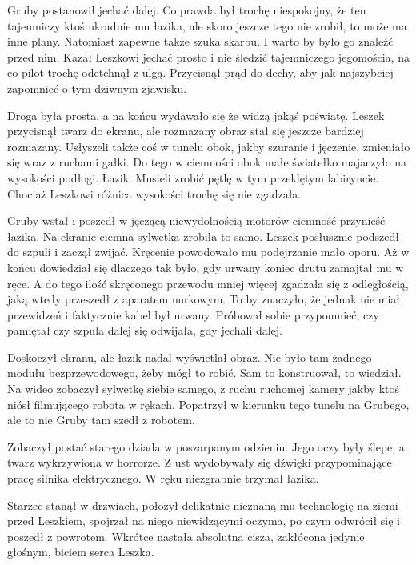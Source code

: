 
Gruby postanowił jechać dalej. Co prawda był trochę niespokojny, że ten tajemniczy ktoś ukradnie mu łazika, ale skoro jeszcze tego nie zrobił, to może ma inne plany.
Natomiast zapewne także szuka skarbu. I warto by było go znaleźć przed nim.
Kazał Leszkowi jechać prosto i nie śledzić tajemniczego jegomościa, na co pilot trochę odetchnął z ulgą.
Przycisnął prąd do dechy, aby jak najszybciej zapomnieć o tym dziwnym zjawisku.

Droga była prosta, a na końcu wydawało się że widzą jakąś poświatę.
Leszek przycisnął twarz do ekranu, ale rozmazany obraz stał się jeszcze bardziej rozmazany.
Usłyszeli także coś w tunelu obok, jakby szuranie i jęczenie, zmieniało się wraz z ruchami gałki.
Do tego w ciemności obok małe światełko majaczyło na wysokości podłogi. Łazik.
Musieli zrobić pętlę w tym przeklętym labiryncie.
Chociaż Leszkowi różnica wysokości trochę się nie zgadzała.

Gruby wstał i poszedł w jęczącą niewydolnością motorów ciemność przynieść łazika.
Na ekranie ciemna sylwetka zrobiła to samo.
Leszek posłusznie podszedł do szpuli i zaczął zwijać.
Kręcenie powodowało mu podejrzanie mało oporu.
Aż w końcu dowiedział się dlaczego tak było, gdy urwany koniec drutu zamajtał mu w ręce.
A do tego ilość skręconego przewodu mniej więcej zgadzała się z odległością, jaką wtedy przeszedł z aparatem nurkowym.
To by znaczyło, że jednak nie miał przewidzeń i faktycznie kabel był urwany.
Próbował sobie przypomnieć, czy pamiętał czy szpula dalej się odwijała, gdy jechali dalej.

Doskoczył ekranu, ale łazik nadal wyświetlał obraz.
Nie było tam żadnego modułu bezprzewodowego, żeby mógł to robić. Sam to konstruował, to wiedział.
Na wideo zobaczył sylwetkę siebie samego, z ruchu ruchomej kamery jakby ktoś niósł filmującego robota w rękach.
Popatrzył w kierunku tego tunelu na Grubego, ale to nie Gruby tam szedł z robotem.

Zobaczył postać starego dziada w poszarpanym odzieniu.
Jego oczy były ślepe, a twarz wykrzywiona w horrorze.
Z ust wydobywały się dźwięki przypominające pracę silnika elektrycznego.
W ręku niezgrabnie trzymał łazika.

Starzec stanął w drzwiach, położył delikatnie nieznaną mu technologię na ziemi przed Leszkiem, spojrzał na niego niewidzącymi oczyma, po czym odwrócił się i poszedł z powrotem.
Wkrótce nastała absolutna cisza, zakłócona jedynie głośnym, biciem serca Leszka.

